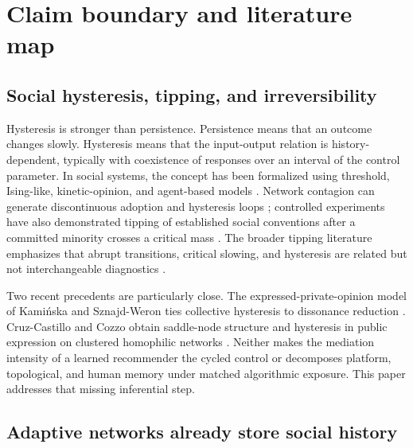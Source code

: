 \documentclass[10pt,a4paper]{article}
\begin{document}
\section{Claim boundary and literature map}

\subsection{Social hysteresis, tipping, and irreversibility}

Hysteresis is stronger than persistence. Persistence means that an outcome changes slowly. Hysteresis means that the input-output relation is history-dependent, typically with coexistence of responses over an interval of the control parameter. In social systems, the concept has been formalized using threshold, Ising-like, kinetic-opinion, and agent-based models \cite{sznajdweron2024toward,nowak2020threshold,oestereich2020hysteresis,macy2021polarization}. Network contagion can generate discontinuous adoption and hysteresis loops \cite{su2017contagion}; controlled experiments have also demonstrated tipping of established social conventions after a committed minority crosses a critical mass \cite{centola2018tipping}. The broader tipping literature emphasizes that abrupt transitions, critical slowing, and hysteresis are related but not interchangeable diagnostics \cite{scheffer2009warning,wiedermann2020threshold}.

Two recent precedents are particularly close. The expressed-private-opinion model of Kami\'nska and Sznajd-Weron ties collective hysteresis to dissonance reduction \cite{kaminska2025cognitive}. Cruz-Castillo and Cozzo obtain saddle-node structure and hysteresis in public expression on clustered homophilic networks \cite{cruzcastillo2026spiral}. Neither makes the mediation intensity of a learned recommender the cycled control or decomposes platform, topological, and human memory under matched algorithmic exposure. This paper addresses that missing inferential step.

\subsection{Adaptive networks already store social history}
\end{document}
